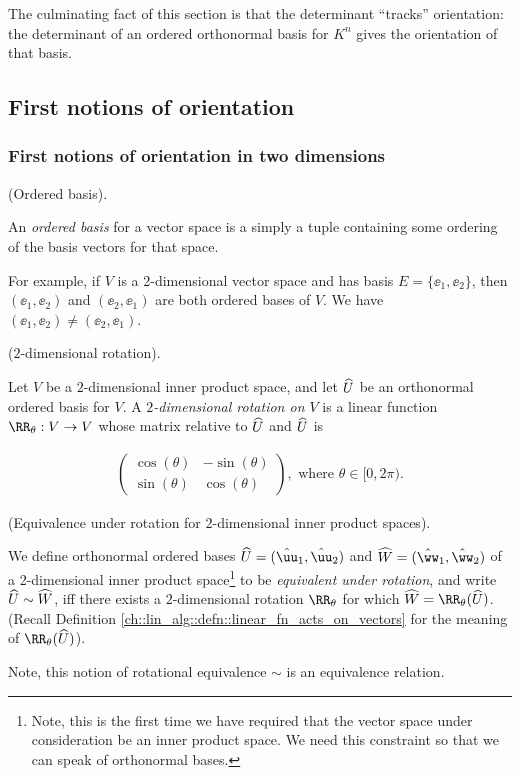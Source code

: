 The culminating fact of this section is that the determinant ``tracks'' orientation: the determinant of an ordered orthonormal basis for $K^n$ gives the orientation of that basis.

\subsection*{First notions of orientation}

\subsubsection*{First notions of orientation in two dimensions}

\begin{defn}
    (Ordered basis).
    
    An \textit{ordered basis} for a vector space is a simply a tuple containing some ordering of the basis vectors for that space.
    
    For example, if $V$ is a 2-dimensional vector space and has basis $E = \{\ee_1, \ee_2\}$, then $(\ee_1, \ee_2)$ and $(\ee_2, \ee_1)$ are both ordered bases of $V$. We have $(\ee_1, \ee_2) \neq (\ee_2, \ee_1)$.
\end{defn}

\begin{defn}
\label{ch::lin_alg::defn::2-rotation}
    ($2$-dimensional rotation).
    
    Let $V$ be a $2$-dimensional inner product space, and let $\widehat{U}$ be an orthonormal ordered basis for $V$.
    A \textit{$2$-dimensional rotation on $V$} is a linear function $\RR_\theta:V \rightarrow V$ whose matrix relative to $\widehat{U}$ and $\widehat{U}$ is
    
    \begin{align*}
        \begin{pmatrix}
            \cos(\theta) & -\sin(\theta) \\
            \sin(\theta) & \cos(\theta)
        \end{pmatrix},
        \text{ where $\theta \in [0, 2\pi)$}.
    \end{align*}
\end{defn}

\begin{defn}
    (Equivalence under rotation for $2$-dimensional inner product spaces).

    We define orthonormal ordered bases $\hU = (\huu_1, \huu_2)$ and $\hW = (\hww_1, \hww_2)$ of a 2-dimensional inner product space\footnote{Note, this is the first time we have required that the vector space under consideration be an inner product space. We need this constraint so that we can speak of orthonormal bases.} to be \textit{equivalent under rotation}, and write $\widehat{U} \sim \widehat{W}$, iff there exists a $2$-dimensional rotation $\RR_\theta$ for which $\hW = \RR_\theta(\hU)$. (Recall Definition \ref{ch::lin_alg::defn::linear_fn_acts_on_vectors} for the meaning of $\RR_\theta(\hU)$).

    Note, this notion of rotational equivalence $\sim$ is an equivalence relation.
\end{defn}

